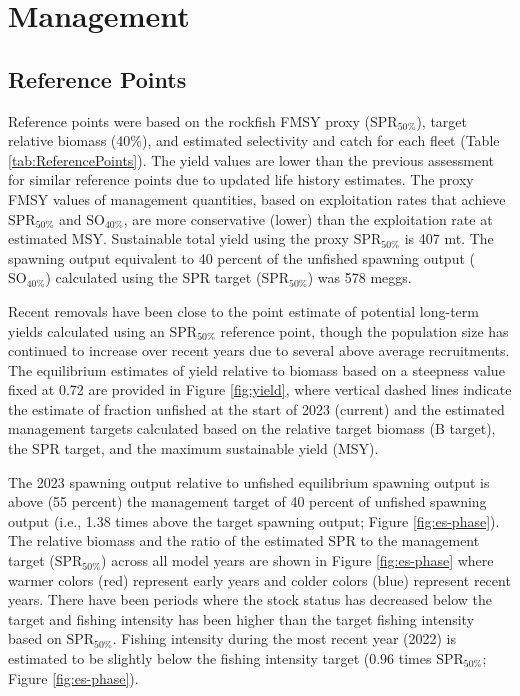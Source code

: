 \documentclass[11pt,
  english,
  letterpaper,
]{article}
\begin{document}
\hypertarget{management}{%
\section{Management}\label{management}}

\hypertarget{reference-points-1}{%
\subsection{Reference Points}\label{reference-points-1}}

Reference points were based on the rockfish FMSY proxy (\(\text{SPR}_{50\%}\)), target relative biomass (40\%), and estimated selectivity and catch for each fleet (Table \ref{tab:ReferencePoints}). The yield values are lower than the previous assessment for similar reference points due to updated life history estimates. The proxy FMSY values of management quantities, based on exploitation rates that achieve \(\text{SPR}_{50\%}\) and \(\text{SO}_{40\%}\), are more conservative (lower) than the exploitation rate at estimated MSY. Sustainable total yield using the proxy \(\text{SPR}_{50\%}\) is 407 mt. The spawning output equivalent to 40 percent of the unfished spawning output (\(\text{SO}_{40\%}\)) calculated using the SPR target (\(\text{SPR}_{50\%}\)) was 578 meggs.

Recent removals have been close to the point estimate of potential long-term yields calculated using an \(\text{SPR}_{50\%}\) reference point, though the population size has continued to increase over recent years due to several above average recruitments. The equilibrium estimates of yield relative to biomass based on a steepness value fixed at 0.72 are provided in Figure \ref{fig:yield}, where vertical dashed lines indicate the estimate of fraction unfished at the start of 2023 (current) and the estimated management targets calculated based on the relative target biomass (B target), the SPR target, and the maximum sustainable yield (MSY).

The 2023 spawning output relative to unfished equilibrium spawning output is above (55 percent) the management target of 40 percent of unfished spawning output (i.e., 1.38 times above the target spawning output; Figure \ref{fig:es-phase}). The relative biomass and the ratio of the estimated SPR to the management target (\(\text{SPR}_{50\%}\)) across all model years are shown in Figure \ref{fig:es-phase} where warmer colors (red) represent early years and colder colors (blue) represent recent years. There have been periods where the stock status has decreased below the target and fishing intensity has been higher than the target fishing intensity based on \(\text{SPR}_{50\%}\). Fishing intensity during the most recent year (2022) is estimated to be slightly below the fishing intensity target (0.96 times \(\text{SPR}_{50\%}\); Figure \ref{fig:es-phase}).
\end{document}

